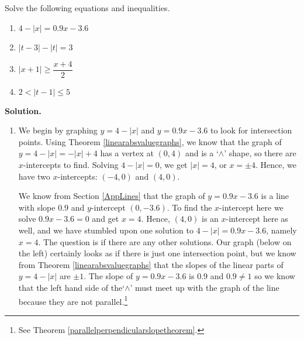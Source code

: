 \documentclass{ximera}
\begin{document}
\begin{example} \label{abseqnineqex}  Solve the following equations and inequalities.  


\begin{multicols}{4}
\begin{enumerate}

\item $4-|x| = 0.9x  - 3.6$ 

\item  $|t-3|  - |t|= 3$ 

\item $|x+1|\geq \dfrac{x+4}{2}$

\item $2 < |t-1| \leq 5$ 


\end{enumerate}
\end{multicols}


{\bf Solution.}  
\begin{enumerate}

\item  We begin by graphing $y = 4 - |x|$ and $y = 0.9x - 3.6$ to look for intersection points. Using Theorem \ref{linearabsvaluegraphs}, we know that the graph of $y = 4-|x| = -|x|+4$ has a vertex at $(0,4)$ and is a `$\wedge$' shape, so there are $x$-intercepts to find.  Solving $4-|x| = 0$, we get $|x| = 4$, or  $x = \pm 4$.  Hence, we have two $x$-intercepts: $(-4,0)$ and $(4,0)$.    

\medskip

We know from Section \ref{AppLines} that the graph of $y = 0.9x - 3.6$ is a line with slope $0.9$ and $y$-intercept $(0, -3.6)$. To find the $x$-intercept here we solve $0.9x - 3.6 = 0$ and get $x = 4$.  Hence, $(4,0)$ is an $x$-intercept here as well, and we have stumbled upon one solution to $4-|x| = 0.9x - 3.6$, namely $x = 4$.  The question is if there are any other solutions.  Our graph (below on the left) certainly looks as if there is just one intersection point, but we know from Theorem \ref{linearabsvaluegraphs} that the slopes of the linear parts of $y = 4 - |x|$ are $\pm 1$.  The slope of $y =  0.9x - 3.6$ is $0.9$ and $0.9 \neq 1$ so we know that the left hand side of the`$\wedge$' must meet up with the graph of the line because they are not parallel.\footnote{See Theorem \ref{parallelperpendicularslopetheorem}.}

\medskip


\end{enumerate}
\end{example}
\end{document}
